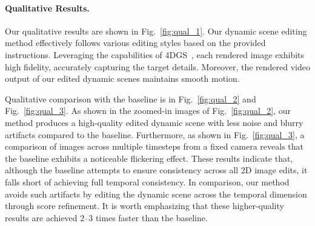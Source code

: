\begin{table}[!t]
\centering
{}
\vspace{-2mm}
\caption{\textbf{Quantitative comparison of editing efficiency}: Our proposed Instruct-4DGS significantly reduces editing time even with fewer GPU resources compared to the baseline.}
\vspace{-3mm}
\label{tab:computing_time_comparison}
\end{table}




\vspace{-5mm}\paragraph{Qualitative Results.} 
Our qualitative results are shown in Fig.~\ref{fig:qual_1}. Our dynamic scene editing method effectively follows various editing styles based on the provided instructions. Leveraging the capabilities of 4DGS~\cite{ref_10_4dgs}, each rendered image exhibits high fidelity, accurately capturing the target details. Moreover, the rendered video output of our edited dynamic scenes maintains smooth motion. 

Qualitative comparison with the baseline is in Fig.~\ref{fig:qual_2} and Fig.~\ref{fig:qual_3}. As shown in the zoomed-in images of Fig.~\ref{fig:qual_2}, our method produces a high-quality edited dynamic scene with less noise and blurry artifacts compared to the baseline. Furthermore, as shown in Fig.~\ref{fig:qual_3}, a comparison of images across multiple timesteps from a fixed camera reveals that the baseline exhibits a noticeable flickering effect. These results indicate that, although the baseline attempts to ensure consistency across all 2D image edits, it falls short of achieving full temporal consistency. In comparison, our method avoids such artifacts by editing the dynamic scene across the temporal dimension through score refinement. It is worth emphasizing that these higher-quality results are achieved 2–3 times faster than the baseline.


